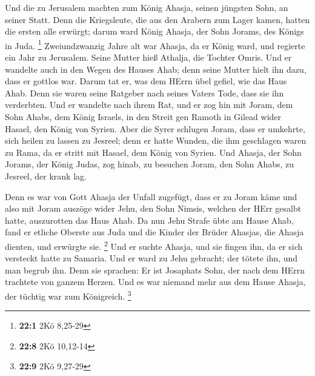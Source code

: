  Und die zu Jerusalem machten zum König Ahasja, seinen
jüngsten Sohn, an seiner Statt. Denn die Kriegsleute, die aus den
Arabern zum Lager kamen, hatten die ersten alle erwürgt; darum ward
König Ahasja, der Sohn Jorams, des Königs in Juda. \footnote{\textbf{22:1}
  2Kö 8,25-29}  Zweiundzwanzig Jahre alt war Ahasja, da er
König ward, und regierte ein Jahr zu Jerusalem. Seine Mutter hieß
Athalja, die Tochter Omris.  Und er wandelte auch in den
Wegen des Hauses Ahab; denn seine Mutter hielt ihn dazu, dass er gottlos
war.  Darum tat er, was dem HErrn übel gefiel, wie das Haus
Ahab. Denn sie waren seine Ratgeber nach seines Vaters Tode, dass sie
ihn verderbten.  Und er wandelte nach ihrem Rat, und er zog
hin mit Joram, dem Sohn Ahabs, dem König Israels, in den Streit gen
Ramoth in Gilead wider Hasael, den König von Syrien. Aber die Syrer
schlugen Joram,  dass er umkehrte, sich heilen zu lassen zu
Jesreel; denn er hatte Wunden, die ihm geschlagen waren zu Rama, da er
stritt mit Hasael, dem König von Syrien. Und Ahasja, der Sohn Jorams,
der König Judas, zog hinab, zu besuchen Joram, den Sohn Ahabs, zu
Jesreel, der krank lag.

 Denn es war von Gott Ahasja der Unfall zugefügt, dass er zu
Joram käme und also mit Joram auszöge wider Jehu, den Sohn Nimsis,
welchen der HErr gesalbt hatte, auszurotten das Haus Ahab. 
Da nun Jehu Strafe übte am Hause Ahab, fand er etliche Oberste aus Juda
und die Kinder der Brüder Ahasjas, die Ahasja dienten, und erwürgte sie.
\footnote{\textbf{22:8} 2Kö 10,12-14}  Und er suchte Ahasja,
und sie fingen ihn, da er sich versteckt hatte zu Samaria. Und er ward
zu Jehu gebracht; der tötete ihn, und man begrub ihn. Denn sie sprachen:
Er ist Josaphats Sohn, der nach dem HErrn trachtete von ganzem Herzen.
Und es war niemand mehr aus dem Hause Ahasja, der tüchtig war zum
Königreich. \footnote{\textbf{22:9} 2Kö 9,27-29}

